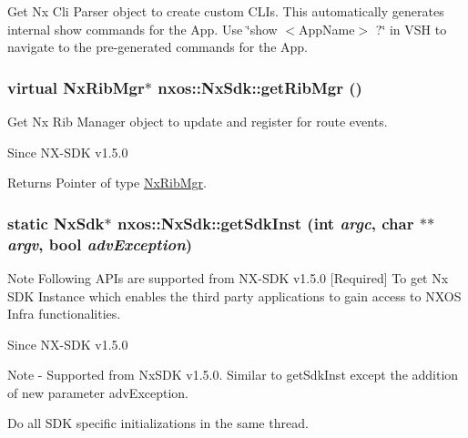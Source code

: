 \label{classnxos_1_1NxSdk_a98bcb70d1bf60e38b41eacdf0a72dc89}
Get Nx Cli Parser object to create custom CLIs. This automatically generates internal show commands for the App. Use \char`\"{}show $<$AppName$>$ ?\char`\"{} in VSH to navigate to the pre-\/generated commands for the App. \hypertarget{classnxos_1_1NxSdk_a3cdb42126b1132cf9aa00426a8d5d428}{
\subsubsection[{getRibMgr}]{\setlength{\rightskip}{0pt plus 5cm}virtual {\bf NxRibMgr}$\ast$ nxos::NxSdk::getRibMgr ()}}
\label{classnxos_1_1NxSdk_a3cdb42126b1132cf9aa00426a8d5d428}
Get Nx Rib Manager object to update and register for route events.

\begin{DoxySince}{Since}
NX-\/SDK v1.5.0
\end{DoxySince}
\begin{DoxyReturn}{Returns}
Pointer of type \hyperlink{classnxos_1_1NxRibMgr}{NxRibMgr}. 
\end{DoxyReturn}
\hypertarget{classnxos_1_1NxSdk_acdeb12edbd291b5421ddb3260547bf8a}{
\subsubsection[{getSdkInst}]{\setlength{\rightskip}{0pt plus 5cm}static {\bf NxSdk}$\ast$ nxos::NxSdk::getSdkInst (int {\em argc}, \/  char $\ast$$\ast$ {\em argv}, \/  bool {\em advException})}}
\label{classnxos_1_1NxSdk_acdeb12edbd291b5421ddb3260547bf8a}
\begin{DoxyNote}{Note}
Following APIs are supported from NX-\/SDK v1.5.0 \mbox{[}Required\mbox{]} To get Nx SDK Instance which enables the third party applications to gain access to NXOS Infra functionalities. 
\end{DoxyNote}
\begin{DoxySince}{Since}
NX-\/SDK v1.5.0
\end{DoxySince}
\begin{DoxyNote}{Note}
-\/ Supported from NxSDK v1.5.0. Similar to getSdkInst except the addition of new parameter advException.
\begin{DoxyItemize}
\item Do all SDK specific initializations in the same thread.
\end{DoxyItemize}
\end{DoxyNote}

